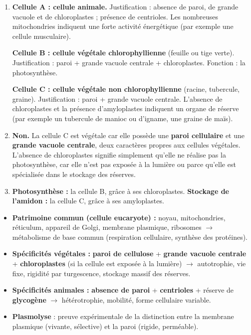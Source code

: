 \documentclass[11pt]{article}
\begin{document}
\begin{corrige}
\begin{enumerate}
    \item \textbf{Cellule A : cellule animale.} Justification : absence de paroi, de grande vacuole et de chloroplastes ; présence de centrioles. Les nombreuses mitochondries indiquent une forte activité énergétique (par exemple une cellule musculaire).
    
    \textbf{Cellule B : cellule végétale chlorophyllienne} (feuille ou tige verte). Justification : paroi + grande vacuole centrale + chloroplastes. Fonction : la photosynthèse.
    
    \textbf{Cellule C : cellule végétale non chlorophyllienne} (racine, tubercule, graine). Justification : paroi + grande vacuole centrale. L'absence de chloroplastes et la présence d'amyloplastes indiquent un organe de réserve (par exemple un tubercule de manioc ou d'igname, une graine de maïs).
    \item \textbf{Non.} La cellule C est végétale car elle possède une \textbf{paroi cellulaire} et une \textbf{grande vacuole centrale}, deux caractères propres aux cellules végétales. L'absence de chloroplastes signifie simplement qu'elle ne réalise pas la photosynthèse, car elle n'est pas exposée à la lumière ou parce qu'elle est spécialisée dans le stockage des réserves.
    \item \textbf{Photosynthèse :} la cellule B, grâce à ses chloroplastes. \textbf{Stockage de l'amidon :} la cellule C, grâce à ses amyloplastes.
\end{enumerate}
\end{corrige}

\begin{aretenir}
\begin{itemize}
    \item \textbf{Patrimoine commun (cellule eucaryote) :} noyau, mitochondries, réticulum, appareil de Golgi, membrane plasmique, ribosomes $\rightarrow$ métabolisme de base commun (respiration cellulaire, synthèse des protéines).
    \item \textbf{Spécificités végétales :} \textbf{paroi de cellulose} + \textbf{grande vacuole centrale} + \textbf{chloroplastes} (si la cellule est exposée à la lumière) $\rightarrow$ autotrophie, vie fixe, rigidité par turgescence, stockage massif des réserves.
    \item \textbf{Spécificités animales :} \textbf{absence de paroi} + \textbf{centrioles} + réserve de \textbf{glycogène} $\rightarrow$ hétérotrophie, mobilité, forme cellulaire variable.
    \item \textbf{Plasmolyse} : preuve expérimentale de la distinction entre la membrane plasmique (vivante, sélective) et la paroi (rigide, perméable).
\end{itemize}
\end{aretenir}
\end{document}
